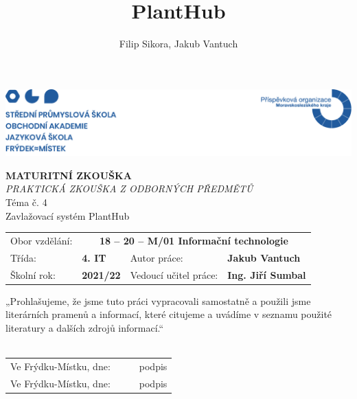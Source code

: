 \documentclass[czech,12pt,a4paper]{article}
\title{PlantHub}
\author{Filip Sikora, Jakub Vantuch}
\date{}
\begin{document}
\renewcommand*\listfigurename{}
\renewcommand{\figurename}{Obr.}
\renewcommand\refname{}

\begin{titlepage}
	\begin{adjustwidth}{-20mm}{-7.5mm} 
		\vspace*{-1.5cm}
		\noindent\includegraphics[width=\linewidth]{header.png}
	\end{adjustwidth}
	\begin{center}
		\vspace*{0.2cm}
		\Huge\textbf{MATURITNÍ ZKOUŠKA}
		\vspace*{1cm} \\
		\large \emph{PRAKTICKÁ ZKOUŠKA Z ODBORNÝCH PŘEDMĚTŮ}
		\vspace*{1cm} \\
		\Large Téma č. 4 \\
		\vspace*{1cm}
		\Large Zavlažovací systém PlantHub \\
		\vfill
		\normalsize
	\end{center}
	\begin{tabularx}{\textwidth}{l@{\hskip 0.5cm}XXl}
		Obor vzdělání: & \multicolumn{3}{c}{\textbf{18 – 20 – M/01 Informační technologie}} \\[10pt]
		Třída: & \textbf{4. IT} & Autor práce: & \textbf{Jakub Vantuch} \\[10pt]
		Školní rok: & \textbf{2021/22} & Vedoucí učitel práce: & \textbf{Ing. Jiří Sumbal}
		\vspace*{1cm}
	\end{tabularx}
	„Prohlašujeme, že jsme tuto práci vypracovali samostatně a použili jsme literárních pramenů a informací, které citujeme a uvádíme v seznamu použité literatury a dalších zdrojů informací.“ \\
	\vspace*{0.5cm} \\
	\renewcommand{\arraystretch}{2}
	\begin{tabularx}{\textwidth}{l@{\hskip 0.75cm}X@{\hskip 1.5cm}X@{\hskip 0.75cm}l}
		Ve Frýdku-Místku, dne: & \dotfill & \dotfill & podpis \\
		Ve Frýdku-Místku, dne: & \dotfill & \dotfill & podpis \\
	\end{tabularx}
\end{titlepage}
\end{document}
